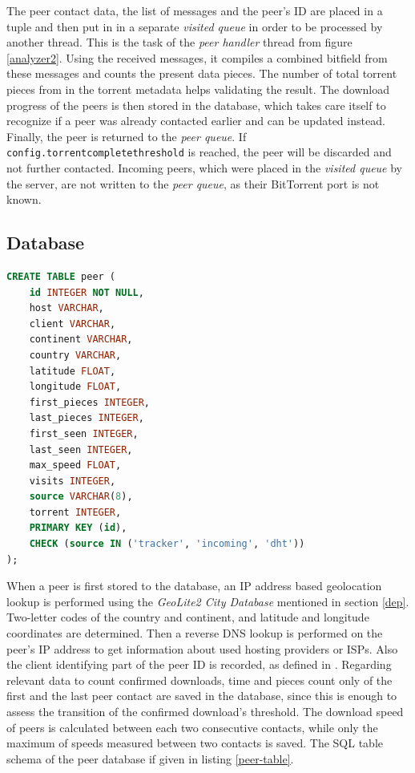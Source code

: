 \documentclass[10pt, a4paper, twoside, headsepline]{scrbook}
\renewcommand{\_}{\origunderscore\allowbreak}
\newcommand{\config}[1]{\texttt{config.\allowbreak #1}}
\begin{document}
The peer contact data, the list of messages and the peer's ID are placed in a tuple and then put in in a separate \emph{visited queue} in order to be processed by another thread. This is the task of the \emph{peer handler} thread from figure \ref{analyzer2}. Using the received messages, it compiles a combined bitfield from these messages and counts the present data pieces. The number of total torrent pieces from in the torrent metadata helps validating the result. The download progress of the peers is then stored in the database, which takes care itself to recognize if a peer was already contacted earlier and can be updated instead. Finally, the peer is returned to the \emph{peer queue}. If \config{torrent\_complete\_threshold} is reached, the peer will be discarded and not further contacted. Incoming peers, which were placed in the \emph{visited queue} by the server, are not written to the \emph{peer queue}, as their BitTorrent port is not known.

\subsection{Database}
\begin{lstlisting}[float, language=SQL, caption={[Schema of the peer table]Schema of the peer table in SQL.}, captionpos=b, label=peer-table]
CREATE TABLE peer (
	id INTEGER NOT NULL,
	host VARCHAR,
	client VARCHAR,
	continent VARCHAR,
	country VARCHAR,
	latitude FLOAT,
	longitude FLOAT,
	first_pieces INTEGER,
	last_pieces INTEGER,
	first_seen INTEGER,
	last_seen INTEGER,
	max_speed FLOAT,
	visits INTEGER,
	source VARCHAR(8),
	torrent INTEGER,
	PRIMARY KEY (id),
	CHECK (source IN ('tracker', 'incoming', 'dht'))
);
\end{lstlisting}

When a peer is first stored to the database, an IP address based geolocation lookup is performed using the \emph{GeoLite2 City Database} mentioned in section \ref{dep}. Two-letter codes of the country and continent, and latitude and longitude coordinates are determined. Then a reverse DNS lookup is performed on the peer's IP address to get information about used hosting providers or ISPs. Also the client identifying part of the peer ID is recorded, as defined in \cite{bep20}. Regarding relevant data to count confirmed downloads, time and pieces count only of the first and the last peer contact are saved in the database, since this is enough to assess the transition of the confirmed download's threshold. The download speed of peers is calculated between each two consecutive contacts, while only the maximum of speeds measured between two contacts is saved. The SQL table schema of the peer database if given in listing \ref{peer-table}.
\end{document}
